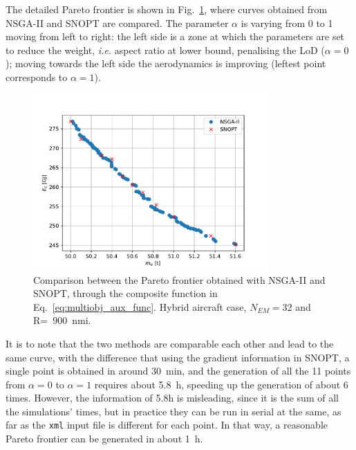 The detailed Pareto frontier is shown in Fig.~\ref{fig:hybrid_dep_pareto_comparison}, where curves obtained from NSGA-II and SNOPT are compared. 
The parameter $\alpha$ is varying from 0 to 1 moving from left to right: the left side is a zone at which the parameters are set to reduce the weight, \textit{i.e.} aspect ratio at lower bound, penalising the LoD ($\alpha=0$); moving towards the left side the aerodynamics is improving (leftest point corresponds to $\alpha=1$). 
\begin{figure}[!h]
	\centering
	\includegraphics[keepaspectratio, width=0.8\textwidth]{images/chap3/hybrid_dep_pareto_comparison}
	\caption{Comparison between the Pareto frontier obtained with NSGA-II and SNOPT, through the composite function in Eq.~\eqref{eq:multiobj_aux_func}. Hybrid aircraft case, $N_{EM}=32$ and R=~900~nmi.}
	\label{fig:hybrid_dep_pareto_comparison}
\end{figure}
It is to note that the two methods are comparable each other and lead to the same curve, with the difference that using the gradient information in SNOPT, a single point is obtained in around 30~\si{\minute}, and the generation of all the 11 points from $\alpha=0$ to $\alpha=1$ requires about 5.8~\si{\hour}, speeding up the generation of about 6 times. 
However, the information of 5.8\si{\hour} is misleading, since it is the sum of all the simulations' times, but in practice they can be run in serial at the same, as far as the \texttt{xml} input file is different for each point. 
In that way, a reasonable Pareto frontier can be generated in about 1~\si{\hour}. 

